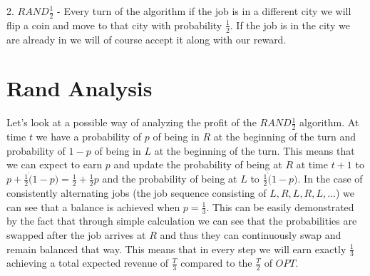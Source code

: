\documentclass[]{article}
\newcommand{\rand}{ $ RAND \frac{1}{2} $ }
\begin{document}
2. \rand - Every turn of the algorithm if the job is in a different city we will flip a coin and move to that city with probability $ \frac{1}{2} $. If the job is in the city we are already in we will of course accept it along with our reward.

\section{Rand Analysis}

Let's look at a possible way of analyzing the profit of the \rand algorithm. At time $ t $ we have a probability of $ p $ of being in $ R $ at the beginning of the turn and probability of $ 1 - p $ of being in $ L $ at the beginning of the turn. This means that we can expect to earn $ p $ and update the probability of being at $ R $ at time $ t + 1 $ to $ p + \frac{1}{2} \dot ( 1 - p ) = \frac{1}{2} + \frac{1}{2}p$ and the probability of being at $ L $ to $ \frac{1}{2} \dot ( 1 - p ) $. In the case of consistently alternating jobs (the job sequence consisting of $ L, R, L, R, L, \ldots $) we can see that a balance is achieved when $ p = \frac{1}{3} $. This can be easily demonstrated by the fact that through simple calculation we can see that the probabilities are swapped after the job arrives at $ R $ and thus they can continuously swap and remain balanced that way. This means that in every step we will earn exactly $ \frac{1}{3} $ achieving a total expected revenue of $ \frac{T}{3} $ compared to the $ \frac{T}{2} $ of $ OPT $.
\end{document}
